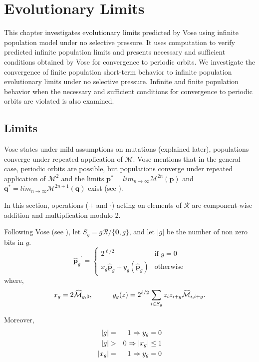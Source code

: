 \chapter{Evolutionary Limits} \label{ch:evolutionary limits}
This chapter investigates evolutionary limits predicted by Vose using infinite population model under no selective pressure. 
It uses computation to verify predicted infinite population limits and presents necessary and sufficient conditions obtained by Vose for 
convergence to periodic orbits. We investigate the convergence of finite population short-term behavior 
to infinite population evolutionary limits under no selective pressure. Infinite and finite population behavior when 
the necessary and sufficient conditions for convergence to periodic orbits are violated is also examined.

\section{Limits}
\label{Limits}
Vose states under mild assumptions on mutations (explained later), populations converge under repeated application 
of $\mathcal{M}$. Vose mentions that in the general case, periodic orbits are possible, but populations converge under 
repeated application of $\mathcal{M}^2$ and the limits ${\bm p}^\ast = lim_{n \rightarrow \infty} \mathcal{M}^{2n}({\bm p})$ 
and ${\bm q}^\ast = lim_{n \rightarrow \infty} \mathcal{M}^{2n+1}({\bm q})$ exist (see \cite{Vose1999}).

In this section, operations ($+$ and $\cdot$) acting on elements of $\mathcal{R}$ are component-wise addition and multiplication modulo 2. 

Following Vose (see \cite{Vose1999}), let $S_g = g \mathcal{R} / \{\textbf{0}, g\}$, and let $|g|$ be the number of non zero bits in $g$.
\[
{{\widehat{{\bm p}}}_g}^{\prime}  = \begin{cases}
    2^{\ell /2}  & \text{if $g = 0$}\\
    x_g \widehat{{\bm p}}_g + y_g(\widehat{{\bm p}}_g) & \text{otherwise}
  \end{cases}
\]
where,
\[
x_g = 2\widehat{\mathcal{M}}_{g,0},  \hspace*{1cm} y_g(z) = 2^{\ell /2} \sum_{i \in S_g} z_i z_{i+g} \widehat{\mathcal{M}}_{i,i+g}.
\]

Moreover, 
\begin{eqnarray*}
|g| & = & 1 \hspace{0.01in} \Rightarrow y_g = 0 \\
|g| & > & 0 \hspace{0.01in} \Rightarrow |x_g| \leq 1 \\
|x_g| & = & 1 \hspace{0.01in} \Rightarrow y_g = 0
\end{eqnarray*}

